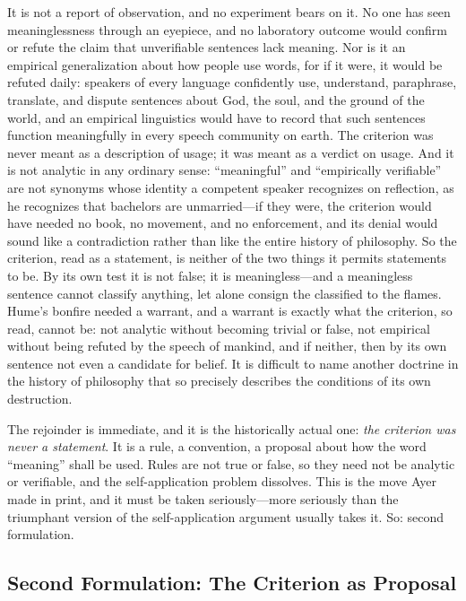 It is not a report of observation, and no experiment bears on it. No one has seen meaninglessness through an eyepiece, and no laboratory outcome would confirm or refute the claim that unverifiable sentences lack meaning. Nor is it an empirical generalization about how people use words, for if it were, it would be refuted daily: speakers of every language confidently use, understand, paraphrase, translate, and dispute sentences about God, the soul, and the ground of the world, and an empirical linguistics would have to record that such sentences function meaningfully in every speech community on earth. The criterion was never meant as a description of usage; it was meant as a verdict on usage. And it is not analytic in any ordinary sense: ``meaningful'' and ``empirically verifiable'' are not synonyms whose identity a competent speaker recognizes on reflection, as he recognizes that bachelors are unmarried---if they were, the criterion would have needed no book, no movement, and no enforcement, and its denial would sound like a contradiction rather than like the entire history of philosophy. So the criterion, read as a statement, is neither of the two things it permits statements to be. By its own test it is not false; it is meaningless---and a meaningless sentence cannot classify anything, let alone consign the classified to the flames. Hume's bonfire needed a warrant, and a warrant is exactly what the criterion, so read, cannot be: not analytic without becoming trivial or false, not empirical without being refuted by the speech of mankind, and if neither, then by its own sentence not even a candidate for belief. It is difficult to name another doctrine in the history of philosophy that so precisely describes the conditions of its own destruction.

The rejoinder is immediate, and it is the historically actual one: \emph{the criterion was never a statement}. It is a rule, a convention, a proposal about how the word ``meaning'' shall be used. Rules are not true or false, so they need not be analytic or verifiable, and the self-application problem dissolves. This is the move Ayer made in print, and it must be taken seriously---more seriously than the triumphant version of the self-application argument usually takes it. So: second formulation.

\subsection{Second Formulation: The Criterion as Proposal}

